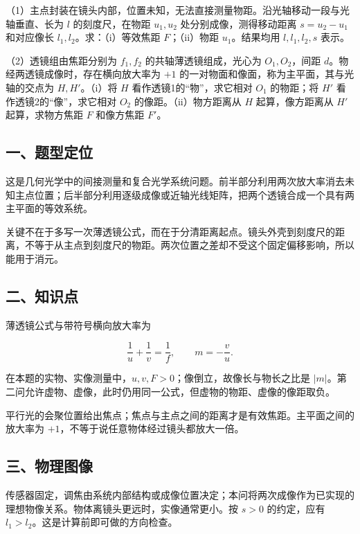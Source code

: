 \documentclass[12pt,a4paper,fontset=fandol]{ctexart}
\begin{document}
（1）主点封装在镜头内部，位置未知，无法直接测量物距。沿光轴移动一段与光轴垂直、长为
\(l\) 的刻度尺，在物距 \(u_1,u_2\) 处分别成像，测得移动距离
\(s=u_2-u_1\) 和对应像长 \(l_1,l_2\)。求：（i）等效焦距
\(F\)；（ii）物距 \(u_1\)。结果均用 \(l,l_1,l_2,s\) 表示。

（2）透镜组由焦距分别为 \(f_1,f_2\) 的共轴薄透镜组成，光心为
\(O_1,O_2\)，间距 \(d\)。物经两透镜成像时，存在横向放大率为 \(+1\)
的一对物面和像面，称为主平面，其与光轴的交点为 \(H,H'\)。（i）将 \(H\)
看作透镜1的``物''，求它相对 \(O_1\) 的物距；将 \(H'\)
看作透镜2的``像''，求它相对 \(O_2\) 的像距。（ii）物方距离从 \(H\)
起算，像方距离从 \(H'\) 起算，求物方焦距 \(F\) 和像方焦距 \(F'\)。

\subsection{一、题型定位}\label{ux4e00ux9898ux578bux5b9aux4f4d}

这是几何光学中的间接测量和复合光学系统问题。前半部分利用两次放大率消去未知主点位置；后半部分利用逐级成像或近轴光线矩阵，把两个透镜合成一个具有两主平面的等效系统。

关键不在于多写一次薄透镜公式，而在于分清距离起点。镜头外壳到刻度尺的距离，不等于从主点到刻度尺的物距。两次位置之差却不受这个固定偏移影响，所以能用于消元。

\subsection{二、知识点}\label{ux4e8cux77e5ux8bc6ux70b9}

薄透镜公式与带符号横向放大率为

\[\frac1u+\frac1v=\frac1f,\qquad m=-\frac vu.\]

在本题的实物、实像测量中，\(u,v,F>0\)；像倒立，故像长与物长之比是
\(|m|\)。第二问允许虚物、虚像，此时仍用同一公式，但虚物的物距、虚像的像距取负。

平行光的会聚位置给出焦点；焦点与主点之间的距离才是有效焦距。主平面之间的放大率为
\(+1\)，不等于说任意物体经过镜头都放大一倍。

\subsection{三、物理图像}\label{ux4e09ux7269ux7406ux56feux50cf}

传感器固定，调焦由系统内部结构或成像位置决定；本问将两次成像作为已实现的理想物像关系。物体离镜头更远时，实像通常更小。按
\(s>0\) 的约定，应有 \(l_1>l_2\)。这是计算前即可做的方向检查。
\end{document}
